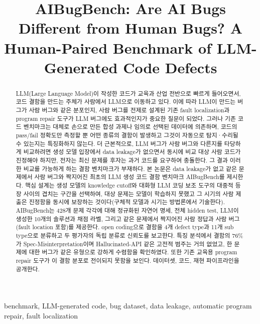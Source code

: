 \documentclass[10pt,conference]{IEEEtran}
\begin{document}
\title{AIBugBench: Are AI Bugs Different from Human Bugs? A Human-Paired Benchmark of LLM-Generated Code Defects}

\maketitle

\begin{abstract}
LLM(Large Language Model)이 작성한 코드가 교육과 산업 전반으로 빠르게 들어오면서, 코드 결함을 만드는 주체가 사람에서 LLM으로 이동하고 있다. 이에 따라 LLM이 만드는 버그가 사람 버그와 같은 분포인지, 사람 버그를 전제로 설계된 기존 fault localization과 program repair 도구가 LLM 버그에도 효과적인지가 중요한 질문이 되었다. 그러나 기존 코드 벤치마크는 대체로 손으로 만든 합성 과제나 임의로 선택된 데이터에 의존하며, 코드의 pass/fail 정확도만 측정할 뿐 어떤 종류의 결함이 발생하고 그것이 자동으로 탐지·수리될 수 있는지는 특징화하지 않는다. 더 근본적으로, LLM 버그가 사람 버그와 다른지를 타당하게 비교하려면 생성 모델 입장에서 data leakage가 없으면서 동시에 비교 대상 사람 코드가 진정해야 하지만, 전자는 최신 문제를 후자는 과거 코드를 요구하여 충돌한다. 그 결과 이러한 비교를 가능하게 하는 결함 벤치마크가 부재하다. 본 논문은 data leakage가 없고 같은 문제에서 사람 버그와 짝지어진 최초의 LLM 생성 코드 결함 벤치마크 AIBugBench를 제시한다. 핵심 설계는 생성 모델의 knowledge cutoff와 대화형 LLM 코딩 보조 도구의 대중적 등장 사이의 겹치는 구간을 선택하여, 대상 문제는 모델이 학습하지 못했고 그 시기의 사람 제출은 진정함을 동시에 보장하는 것이다(구체적 모델과 시기는 방법론에서 기술한다). AIBugBench는 428개 문제 각각에 대해 정규화된 자연어 명세, 전체 hidden test, LLM이 생성한 10개의 솔루션과 채점 라벨, 그리고 같은 문제에서 짝지어진 사람 정답과 사람 버그(fault location 포함)를 제공한다. open coding으로 결함을 4개 defect type과 11개 sub type으로 분류하고 두 평가자의 독립 분류로 신뢰도를 보고한다. 특징 분석에서 결함의 76\%가 Spec-Misinterpretation이며 Hallucinated-API 같은 고전적 범주는 거의 없었고, 한 문제에 대한 버그가 같은 유형으로 강하게 수렴함을 확인하였다. 또한 기존 교육용 program repair 도구가 이 결함 분포로 전이되지 못함을 보인다. 데이터셋, 코드, 재현 파이프라인을 공개한다.
\end{abstract}

\begin{IEEEkeywords}
benchmark, LLM-generated code, bug dataset, data leakage, automatic program repair, fault localization
\end{IEEEkeywords}
\end{document}
